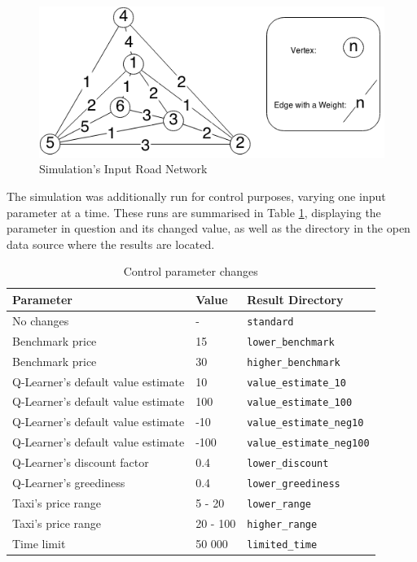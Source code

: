 \begin{figure}
\begin{center}
  \includegraphics[width=\textwidth]{../figures/road_network}
  \caption{
    Simulation's Input Road Network
    \label{figure:results:road_network}
  }
\end{center}
\end{figure}

The simulation was additionally run for control purposes, varying one input
parameter at a time. These runs are summarised in Table
\ref{table:inputs:control}, displaying the parameter in question and its
changed value, as well as the directory in the open data source where the
results are located.

\begin{table}
\begin{tabular}{ | l | l | l | }
  \hline
  Parameter & Value & Result Directory \\ \hline
  No changes & - & \texttt{standard} \\
  Benchmark price & 15 & \texttt{lower\_benchmark} \\
  Benchmark price & 30 & \texttt{higher\_benchmark} \\
  Q-Learner's default value estimate & 10 & \texttt{value\_estimate\_10} \\
  Q-Learner's default value estimate & 100 & \texttt{value\_estimate\_100} \\
  Q-Learner's default value estimate & -10 & \texttt{value\_estimate\_neg10} \\
  Q-Learner's default value estimate & -100 & \texttt{value\_estimate\_neg100} \\
  Q-Learner's discount factor & 0.4 & \texttt{lower\_discount} \\
  Q-Learner's greediness & 0.4 & \texttt{lower\_greediness} \\
  Taxi's price range & 5 - 20 & \texttt{lower\_range} \\
  Taxi's price range & 20 - 100 & \texttt{higher\_range} \\
  Time limit & 50 000 & \texttt{limited\_time} \\
  \hline
\end{tabular}
\caption{
  Control parameter changes
  \label{table:inputs:control}
}
\end{table}

